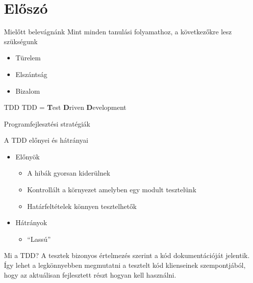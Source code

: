 
\section{Előszó}

\begin{frame}{Mielőtt belevágnánk}
  Mint minden tanulási folyamathoz, a következőkre lesz szükségunk
  \begin{itemize}[<+->]
  \item Türelem
  \item Elszántság
  \item Bizalom
  \end{itemize}
\end{frame}

\begin{frame}{TDD}
  TDD = \textbf{T}est \textbf{D}riven \textbf{D}evelopment
\end{frame}

\begin{frame}{Programfejlesztési stratégiák}

\end{frame}

\begin{frame}{A TDD előnyei és hátrányai}
  \begin{itemize}[<+->]
  \item Előnyök
    \begin{itemize}
    \item A hibák gyorsan kiderülnek
    \item Kontrollált a környezet amelyben egy modult tesztelünk
    \item Határfeltételek könnyen tesztelhetők
    \end{itemize}
  \item Hátrányok
    \begin{itemize}
    \item ``Lassú''
    \end{itemize}
  \end{itemize}
\end{frame}

\begin{frame}{Mi a TDD?}
  A tesztek bizonyos értelmezés szerint a kód dokumentációját
  jelentik. Így lehet a legkönnyebben megmutatni a tesztelt kód
  klienseinek szempontjából, hogy az aktuálisan fejlesztett részt
  hogyan kell használni.
\end{frame}

